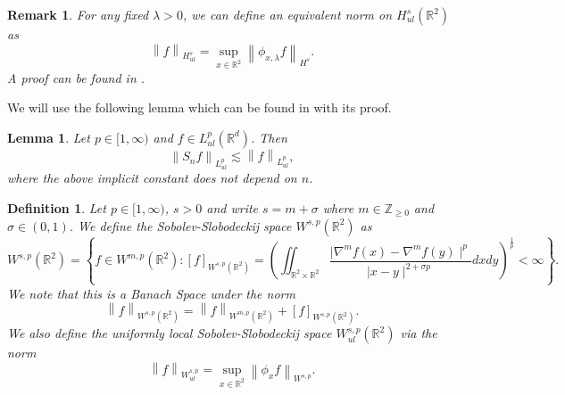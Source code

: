\documentclass[12pt,xcolor=svgnames]{amsart}
\newtheorem{lemma}[theorem]{Lemma}
\newtheorem{definition}[theorem]{Definition}
\newtheorem{remark}[theorem]{Remark}
\newcommand{\R}{\mathbb{R}}
\newcommand{\abs}[1]{\mid\!#1\!\mid}
\newcommand{\norm}[2]{\left\lVert#1\right\rVert_{#2}}
\begin{document}
\begin{remark} For any fixed $\lambda>0$, we can define an equivalent norm on $H^s_{ul}(\R^2)$ as $$\norm{f}{H^s_{ul}}=\sup_{x \in \R^2}\norm{\phi_{x,\lambda}f}{H^s}.$$ A proof can be found in \cite{12}.
\end{remark}

We will use the following lemma which can be found in \cite{1} with its proof.
\begin{lemma}
\label{Lp norm of Snf}
Let $p \in [1,\infty)$ and $f \in L_{ul}^p(\R^d)$. Then 
$$
\norm{S_nf}{L_{ul}^p} \lesssim\norm{f}{L_{ul}^p},
$$
where the above implicit constant does not depend on $n$.
\end{lemma}

\begin{definition} Let $p \in [1,\infty)$, $s>0$ and write $s=m+\sigma$ where $m \in \mathbb{Z}_{\geq 0}$ and $\sigma \in (0,1)$. We define the Sobolev-Slobodeckij space $W^{s,p}(\R^2)$ as
$$
W^{s,p}(\R^2) = \left\{f \in W^{m,p}(\R^2) : \left[f \right]_{W^{s,p}(\R^2)} = \left(\iint_{\R^2 \times \R^2} \frac{\abs{\nabla^mf(x)-\nabla^mf(y)}^p}{\abs{x-y}^{2+\sigma p}} dx dy\right)^{\frac{1}{p}} <\infty \right\}. 
$$
We note that this is a Banach Space under the norm
$$
\norm{f}{W^{s,p}(\R^2)} = \norm{f}{W^{m,p}(\R^2)} + \left[f \right]_{W^{s,p}(\R^2)}. 
$$
We also define the uniformly local Sobolev-Slobodeckij space $W_{ul}^{s,p}(\R^2)$ via the norm 
\begin{equation}
\label{SSul norm}
\norm{f}{W_{ul}^{s,p}} = \sup_{x\in \R^2} \norm{\phi_xf}{W^{s,p}}.
\end{equation}

\end{definition}
\end{document}
